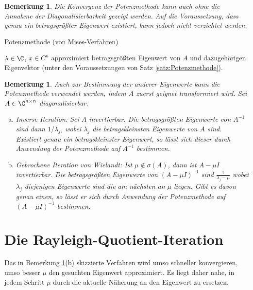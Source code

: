 \documentclass[
]{mycourse}
\theoremstyle{mythm}
\newtheorem{bemerkung}[theorem]{Bemerkung}
\theoremstyle{break}
\newcommand{\norm}[1]{\left\Vert#1\right\Vert}		%
\begin{document}
\begin{bemerkung}
Die Konvergenz der Potenzmethode kann auch ohne die Annahme der Diagonalisierbarkeit gezeigt werden. Auf die Voraussetzung, 
dass genau ein \emph{betragsgrößter} Eigenwert existiert, kann jedoch nicht verzichtet werden.
\end{bemerkung}

\begin{algorithm}
\caption{Potenzmethode (von Mises-Verfahren)}
\label{algo:Potenzmethode}
\begin{algorithmic}
\REPEAT
{}
\STATE{$x:=\tilde x / \norm{\tilde x}$}
\RETURN $\lambda\in \C$, $x\in C^n$ approximiert betragsgrößten Eigenwert von $A$ und dazugehörigen Eigenvektor (unter den Voraussetzungen von Satz 
\ref{satz:Potenzmethode}).
\end{algorithmic}
\end{algorithm}


\begin{bemerkung}\label{bem:PM_andereEW}
Auch zur Bestimmung der anderer Eigenwerte kann die Potenzmethode verwendet werden, indem $A$ zuerst geignet transformiert wird.
Sei $A\in \C^{n\times n}$ diagonalisierbar.
\begin{enumerate}[(a)]
\item \emph{Inverse Iteration:} Sei $A$ invertierbar. Die betragsgrößten Eigenwerte von $A^{-1}$ sind dann  $1/\lambda_j$, wobei 
$\lambda_j$ die betragskleinsten Eigenwerte von $A$ sind. Existiert genau ein betragskleinster Eigenwert, so lässt sich dieser durch Anwendung der Potenzmethode auf $A^{-1}$ bestimmen. 
%
\item \emph{Gebrochene Iteration von Wielandt}: Ist $\mu\not\in \sigma(A)$, dann ist $A-\mu I$ invertierbar.
Die betragsgrößten Eigenwerte von $(A-\mu I)^{-1}$ sind $\frac{1}{\lambda_j-\mu}$ wobei $\lambda_j$ diejenigen Eigenwerte sind die
am nächsten an $\mu$ liegen. Gibt es davon genau einen, so lässt er sich durch Anwendung der Potenzmethode auf $(A-\mu I)^{-1}$ bestimmen.
\end{enumerate}
\end{bemerkung}

\section{Die Rayleigh-Quotient-Iteration}\label{sect:RQ}
Das in Bemerkung \ref{bem:PM_andereEW}(b) skizzierte Verfahren wird umso schneller konvergieren, umso besser $\mu$ den gesuchten Eigenwert 
approximiert. Es liegt daher nahe, in jedem Schritt $\mu$ durch die aktuelle Näherung an den Eigenwert zu ersetzen. 
\end{document}
